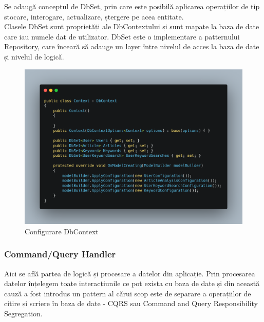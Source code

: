 Se adaugă conceptul de DbSet, prin care este posibilă aplicarea operațiilor de tip stocare, interogare, actualizare, ștergere pe acea entitate.\\
Clasele DbSet sunt proprietăți ale DbContextului și sunt mapate la baza de date care iau numele dat de utilizator.
DbSet este o implementare a patternului Repository, care înceară să adauge un layer între nivelul de acces la baza de date și nivelul de logică.

\begin{figure}[H]
	\centering
	\includegraphics[width=150mm]{figs/dbContext.png}
	\caption{Configurare DbContext}
	\label{fig:dbContext}
\end{figure}

\subsubsection{Command/Query Handler}
Aici se află partea de logică și procesare a datelor din aplicație. Prin procesarea datelor înțelegem toate interacțiunile ce pot exista cu baza de date și din această cauză a fost introdus un pattern al cărui scop este de separare a operațiilor de citire și scriere în baza de date - CQRS sau Command and Query Responsibility Segregation. \\

